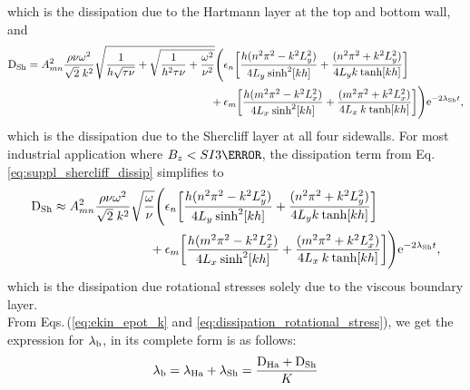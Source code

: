 \documentclass[aps,prfluids,reprint,superscriptaddress]{revtex4-2}
\newcommand{\ii}[1]{\text{#1}}
\newcommand{\nn}{\nonumber}
\numberwithin{equation}{section}
\begin{document}
which is the dissipation due to the Hartmann layer at the top and bottom wall, and
\begin{align}
	\nn
	\ii D_{\rm Sh}  = A_{mn}^2
	\frac{\rho\nu\omega^2}{\sqrt{2} \; k^2}
	\sqrt{ \frac{1}{h\sqrt{\tau\nu}} + 
		\sqrt{ \frac{1}{h^2\tau\nu} + \frac{\omega^2}{\nu^2}}}
	\Biggl(
	&\epsilon_n 
	\biggl[
	\frac{h(n^2\pi^2  - k^2L_y^2)}{4L_y\:\text{sinh}^2[kh]}
	+ \frac{(n^2\pi^2 + k^2L_y^2)}{4L_yk\:\text{tanh}[kh]}
	\biggr]
	\\
	 + \:
	&\epsilon_m
	\biggl[
	\frac{h(m^2\pi^2  - k^2L_x^2)}{4L_x\:\text{sinh}^2[kh]}
	+ \frac{(m^2\pi^2 + k^2L_x^2)}{4L_x \: k\:\text{tanh}[kh]}
	\biggr]
	\Biggr) \ii{e}^{-2\lambda_{\rm Sh} t} ,
	\label{eq:suppl_shercliff_dissip}
\end{align}
which is the dissipation due to the Shercliff layer at all four sidewalls. For most industrial application where $B_z < SI{3}{\tesla}$, the dissipation term from Eq.\,\eqref{eq:suppl_shercliff_dissip} simplifies to
\begin{align}
	\nn
	\ii D_{\rm Sh} 
	\approx 
	A_{mn}^2
	\frac{\rho\nu\omega^2}{\sqrt{2} \; k^2}
	\sqrt{\frac{\omega}{\nu}}
	\Biggl(
	&\epsilon_n 
	\biggl[
	\frac{h(n^2\pi^2  - k^2L_y^2)}{4L_y\:\text{sinh}^2[kh]}
	+ \frac{(n^2\pi^2 + k^2L_y^2)}{4L_yk\:\text{tanh}[kh]}
	\biggr]
	\\
	+\:
	&\epsilon_m
	\biggl[
	\frac{h(m^2\pi^2  - k^2L_x^2)}{4L_x\:\text{sinh}^2[kh]}
	 + 
	\frac{(m^2\pi^2 + k^2L_x^2)}{4L_x \: k\:\text{tanh}[kh]}
	\biggr]
	\Biggr) \ii{e}^{-2\lambda_{\rm Sh} t},
\end{align}
which is the dissipation due rotational stresses solely due to the viscous boundary layer.
\\
\indent From Eqs.\,(\ref{eq:ekin_epot_k} and \ref{eq:dissipation_rotational_stress}), we get the expression for $\lambda_{\rm b}$, in its complete form is as follows:
\begin{equation}
	\lambda_{\rm b} = \lambda_{\rm Ha} + \lambda_{\rm Sh} 
	=
	\frac{\ii D_{\rm Ha}
	+ \ii D_{\rm Sh} }{K} 
\end{equation}
\end{document}

